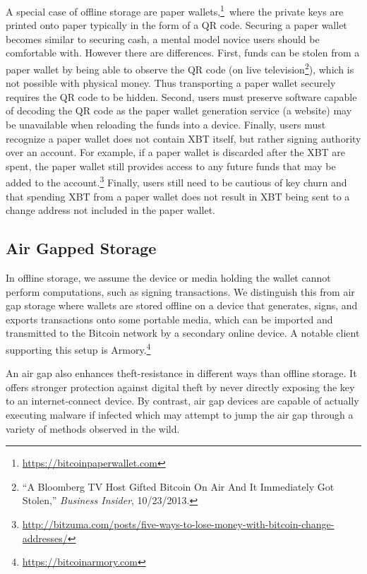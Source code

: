 A special case of offline storage are paper wallets,\footnote{\url {https://bitcoinpaperwallet.com}}\ where the private keys are printed onto paper typically in the form of a QR code. Securing a paper wallet becomes similar to securing cash, a mental model novice users should be comfortable with. However there are differences. First, funds can be stolen from a paper wallet by being able to observe the QR code (\eg on live television\footnote{``A Bloomberg TV Host Gifted Bitcoin On Air And It Immediately Got Stolen,'' \textit{Business Insider}, 10/23/2013.}), which is not possible with physical money. Thus transporting a paper wallet securely requires the QR code to be hidden. Second, users must preserve software capable of decoding the QR code as the paper wallet generation service (\eg a website) may be unavailable when reloading the funds into a device. Finally, users must recognize a paper wallet does not contain XBT itself, but rather signing authority over an account. For example, if a paper wallet is discarded after the XBT are spent, the paper wallet still provides access to any future funds that may be added to the account.\footnote{\url{http://bitzuma.com/posts/five-ways-to-lose-money-with-bitcoin-change-addresses/}} Finally, users still need to be cautious of key churn and that spending XBT from a paper wallet does not result in XBT being sent to a change address not included in the paper wallet. 

\subsection{Air Gapped Storage}

In offline storage, we assume the device or media holding the wallet cannot perform computations, such as signing transactions. We distinguish this from air gap storage where wallets are stored offline on a device that generates, signs, and exports transactions onto some portable media, which can be imported and transmitted to the Bitcoin network by a secondary online device. A notable client supporting this setup is Armory.\footnote{\url{https://bitcoinarmory.com}} 

An air gap also enhances theft-resistance in different ways than offline storage. It offers stronger protection against digital theft by never directly exposing the key to an internet-connect device. By contrast, air gap devices are capable of actually executing malware if infected which may attempt to jump the air gap through a variety of methods observed in the wild.~\cite{}

